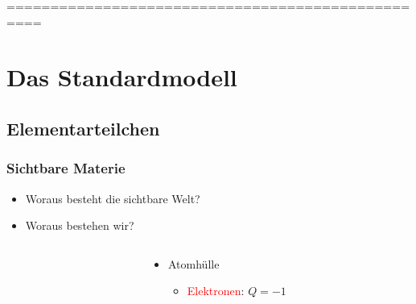 \documentclass{beamer}
\begin{document}
==================================================
\section{Das Standardmodell}
\subsection{Elementarteilchen}
\begin{frame}[t]
  \frametitle{Sichtbare Materie}
  \begin{itemize}
  \item Woraus besteht die sichtbare Welt?
  \item Woraus bestehen wir?
  \end{itemize}
  \vskip0.3cm
  \begin{columns}
    \begin{column}{0.25\textwidth}
      \vskip1.5cm
      \centering
    \end{column}
    \begin{column}{0.55\textwidth}
      \vskip0.1cm
      \begin{itemize}
      \item<2-> Atomh\"ulle
        \begin{itemize}
        \item<3-> \textcolor{red}{Elektronen}: $Q=-1$
        \end{itemize}

\end{itemize}
\end{column}
\end{columns}
\end{frame}
\end{document}
